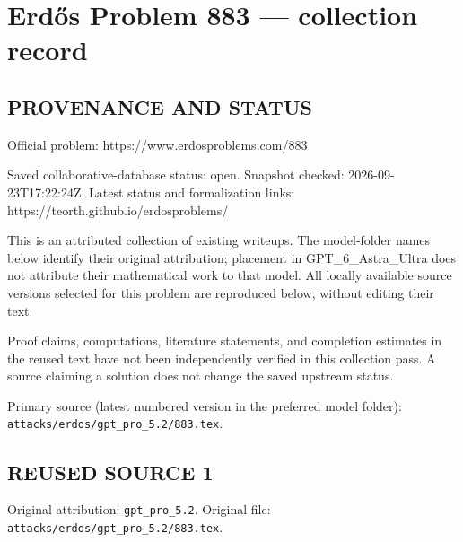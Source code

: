 \section*{Erd\H{o}s Problem 883 --- collection record}

\subsection*{PROVENANCE AND STATUS}
Official problem: https://www.erdosproblems.com/883

Saved collaborative-database status: open.
Snapshot checked: 2026-09-23T17:22:24Z.
Latest status and formalization links: https://teorth.github.io/erdosproblems/

This is an attributed collection of existing writeups. The model-folder names below identify their original attribution; placement in GPT\_6\_Astra\_Ultra does not attribute their mathematical work to that model. All locally available source versions selected for this problem are reproduced below, without editing their text.

Proof claims, computations, literature statements, and completion estimates in the reused text have not been independently verified in this collection pass. A source claiming a solution does not change the saved upstream status.

Primary source (latest numbered version in the preferred model folder): \texttt{attacks/erdos/gpt\_pro\_5.2/883.tex}.

\subsection*{REUSED SOURCE 1}
Original attribution: \texttt{gpt\_pro\_5.2}.
Original file: \texttt{attacks/erdos/gpt\_pro\_5.2/883.tex}.


